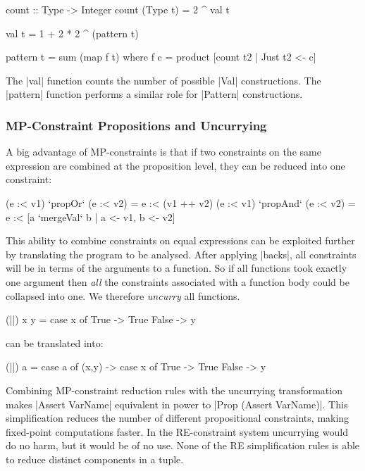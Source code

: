\begin{code}
count :: Type -> Integer
count (Type t) = 2 ^ val t

val t = 1 + 2 * 2 ^ (pattern t)

pattern t = sum (map f t)
    where f c = product [count t2 | Just t2 <- c]
\end{code}

The |val| function counts the number of possible |Val| constructions. The |pattern| function performs a similar role for |Pattern| constructions.


\subsubsection{MP-Constraint Propositions and Uncurrying}

A big advantage of MP-constraints is that if two constraints on the same expression are combined at the proposition level, they can be reduced into one constraint:

\ignore\begin{code}
(e :< v1)  `propOr`   (e :< v2) = e :< (v1 ++ v2)
(e :< v1)  `propAnd`  (e :< v2) = e :< [a `mergeVal` b | a <- v1, b <- v2]
\end{code}

\noindent This ability to combine constraints on equal expressions can be exploited further by translating the program to be analysed. After applying |backs|, all constraints will be in terms of the arguments to a function. So if all functions took exactly one argument then \textit{all} the constraints associated with a function body could be collapsed into one. We therefore \textit{uncurry} all functions.

\begin{example}
\begin{code}
(||) x y = case  x of
                 True   -> True
                 False  -> y
\end{code}

\noindent can be translated into:

\begin{code}
(||) a = case  a of
               (x,y) -> case  x of
                              True    -> True
                              False   -> y
\end{code}\codeexample
\end{example}

Combining MP-constraint reduction rules with the uncurrying transformation makes |Assert VarName| equivalent in power to |Prop (Assert VarName)|. This simplification reduces the number of different propositional constraints, making fixed-point computations faster. In the RE-constraint system uncurrying would do no harm, but it would be of no use. None of the RE simplification rules is able to reduce distinct components in a tuple.


